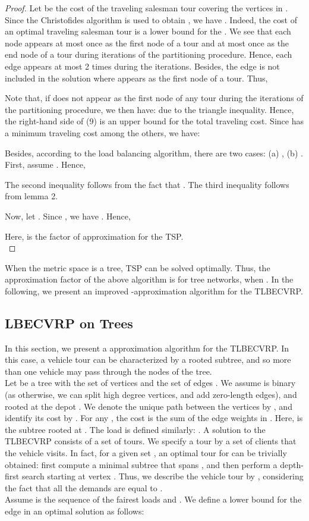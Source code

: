 \begin{proof}
Let  be the cost of the traveling salesman tour  covering the vertices in . Since the Christofides algorithm is used to obtain , we have . Indeed, the cost of an optimal traveling salesman tour is a lower bound for the . We see that each node  appears at most once as the first node of a tour and at most once as the end node of a tour during  iterations of the partitioning procedure. Hence, each edge  appears at most 2 times during the iterations. Besides, the edge  is not included in the solution where  appears as the first node of a tour. Thus,

\noindent Note that, if  does not appear as the first node of any tour during the  iterations of the partitioning procedure, we then have:  due to the triangle inequality. Hence, the right-hand side of (9) is an upper bound for the total traveling cost. Since  has a minimum traveling cost among the others, we have:

\noindent Besides, according to the load balancing algorithm, there are two cases: (a) , (b) .\\
\indent  First, assume . Hence,

\noindent The second inequality follows from the fact that . The third inequality follows from lemma 2. 

\indent Now, let . Since , we have . Hence,

\noindent Here,  is the factor of approximation for the TSP.\\
 
\end{proof}
\noindent  When the metric space is a tree, TSP can be solved optimally. Thus, the approximation factor of the above algorithm is  for tree networks, when . In the following, we present an improved -approximation algorithm for the TLBECVRP.
\subsection{LBECVRP on Trees}
\noindent In this section, we present a approximation algorithm for the TLBECVRP. In this case, a vehicle tour can be characterized by a rooted subtree, and so more than one vehicle may pass through the nodes of the tree. \\
\indent  Let  be a tree with the set of vertices  and the set of edges . We assume  is binary (as otherwise, we can split high degree vertices, and add zero-length edges), and rooted at the depot . We denote the unique path between the vertices  by , and identify its cost by . For any , the cost  is the sum of the edge weights in . Here,  is the subtree rooted at . The load  is defined similarly: . A solution to the TLBECVRP consists of a set of tours. We specify a tour by a set of clients that the vehicle visits. In fact, for a given set , an optimal tour for  can be trivially obtained: first compute a minimal subtree that spans , and then perform a depth-first search starting at vertex . Thus, we describe the  vehicle tour by , considering the fact that all the demands are equal to . \\
\indent Assume  is the sequence of the fairest loads and . We define a lower bound for the edge  in an optimal solution as follows:

